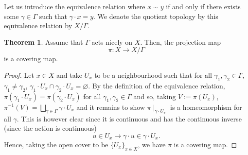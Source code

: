\documentclass[]{article}
\theoremstyle{definition}
\newtheorem{theorem}{Theorem}
\theoremstyle{definition}
\begin{document}
Let us introduce the equivalence relation where \(x \sim y\) if and only if 
there exists some \(\gamma \in \Gamma\) such that \(\gamma \cdot x = y\). 
We denote the quotient topology by this equivalence relation by \(X / \Gamma\).

\begin{theorem}
  Assume that \(\Gamma\) acts nicely on \(X\). Then, the projection map 
  \[\pi : X \to X / \Gamma\]
  is a covering map.
\end{theorem}
\begin{proof}
  Let \(x \in X\) and take \(U_x\) to be a neighbourhood such that for all 
  \(\gamma_1, \gamma_2 \in \Gamma\), \(\gamma_1 \neq \gamma_2\), 
  \(\gamma_1 \cdot U_x \cap \gamma_2 \cdot U_x = \varnothing\). By the definition 
  of the equivalence relation, \(\pi(\gamma_1 \cdot U_x) = \pi(\gamma_2 \cdot U_x)\)
  for all \(\gamma_1, \gamma_2 \in \Gamma\) and so, taking \(V := \pi(U_x)\), 
  \(\pi^{-1}(V) = \bigsqcup_{\gamma \in \Gamma} \gamma \cdot U_x\) and it remains 
  to show \(\pi\mid_{\gamma \cdot U_x}\) is a homeomorphism for all \(\gamma\). 
  This is however clear since it is continuous and has the continuous inverse 
  (since the action is continuous)
  \[u \in U_x \mapsto \gamma \cdot u \in \gamma \cdot U_x.\]
  Hence, taking the open cover to be \(\{U_x\}_{x \in X}\), we have \(\pi\) is 
  a covering map.
\end{proof}
\end{document}
